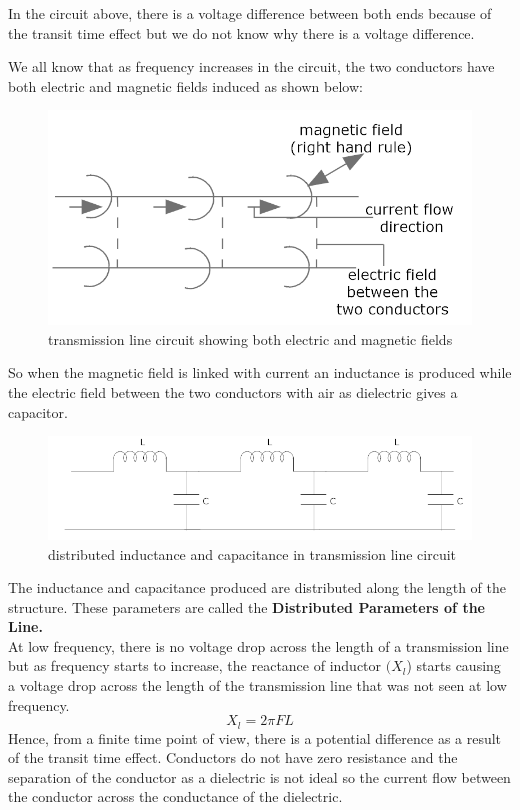 In the circuit above, there is a voltage difference between both ends because of the transit time effect but we do not know why there is a voltage difference.

We all know that as frequency increases in the circuit, the two conductors have both electric and magnetic fields induced as shown below: 

\begin{figure}[h]
\centering
\includegraphics[width=1\linewidth]{./graphics/third}
\caption{transmission line circuit showing both electric and magnetic fields}
\end{figure}

So when the magnetic field is linked with current an inductance is produced while the electric field between the two conductors with air as dielectric gives a capacitor.

\begin{figure}[h]
\centering
\includegraphics[width=1\linewidth]{./graphics/fifth}
\caption{distributed inductance and capacitance in transmission line circuit}
\end{figure}
The inductance and capacitance produced are distributed along the length of the structure. These parameters are called the \textbf{Distributed Parameters of the Line.} \\
At low frequency, there is no voltage drop across the length of a transmission line but as frequency starts to increase, the reactance of inductor $ (X_{l} $) starts causing a voltage drop across the length of the transmission line that was not seen at low frequency.
\[ 	X_{l} = 2 \pi FL \]
Hence, from a finite time point of view, there is a potential difference as a result of the transit time effect. Conductors do not have zero resistance and the separation of the conductor as a dielectric is not ideal so the current flow between the conductor across the conductance of the dielectric.\\

